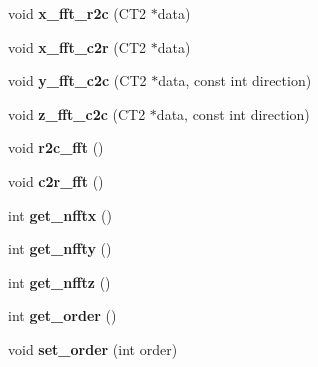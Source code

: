 \begin{DoxyCompactItemize}
\item 
\hypertarget{classCudaPMERecip_a7ec365cc8c4a9cb3cb5b58d575ebf40c}{}\label{classCudaPMERecip_a7ec365cc8c4a9cb3cb5b58d575ebf40c} 
void {\bfseries x\+\_\+fft\+\_\+r2c} (C\+T2 $\ast$data)
\item 
\hypertarget{classCudaPMERecip_af59edddef7fc70c6788594d7872b2001}{}\label{classCudaPMERecip_af59edddef7fc70c6788594d7872b2001} 
void {\bfseries x\+\_\+fft\+\_\+c2r} (C\+T2 $\ast$data)
\item 
\hypertarget{classCudaPMERecip_a3e83fe23990aa4501e64255473828ba5}{}\label{classCudaPMERecip_a3e83fe23990aa4501e64255473828ba5} 
void {\bfseries y\+\_\+fft\+\_\+c2c} (C\+T2 $\ast$data, const int direction)
\item 
\hypertarget{classCudaPMERecip_a86a345d67878a9f8d42bfc3c0eadbbd9}{}\label{classCudaPMERecip_a86a345d67878a9f8d42bfc3c0eadbbd9} 
void {\bfseries z\+\_\+fft\+\_\+c2c} (C\+T2 $\ast$data, const int direction)
\item 
\hypertarget{classCudaPMERecip_a7b6245521dd5912a5ec31c7c13f7433c}{}\label{classCudaPMERecip_a7b6245521dd5912a5ec31c7c13f7433c} 
void {\bfseries r2c\+\_\+fft} ()
\item 
\hypertarget{classCudaPMERecip_ae638f74b6074d4c50fdd41ff84a8bfdd}{}\label{classCudaPMERecip_ae638f74b6074d4c50fdd41ff84a8bfdd} 
void {\bfseries c2r\+\_\+fft} ()
\item 
\hypertarget{classCudaPMERecip_a6fdbe5f297b227e69d8cf7638012f296}{}\label{classCudaPMERecip_a6fdbe5f297b227e69d8cf7638012f296} 
int {\bfseries get\+\_\+nfftx} ()
\item 
\hypertarget{classCudaPMERecip_a16d048d9f9f23644a6021c45c685c0ef}{}\label{classCudaPMERecip_a16d048d9f9f23644a6021c45c685c0ef} 
int {\bfseries get\+\_\+nffty} ()
\item 
\hypertarget{classCudaPMERecip_a8380c164295fb5fe3f8c823b8c655b85}{}\label{classCudaPMERecip_a8380c164295fb5fe3f8c823b8c655b85} 
int {\bfseries get\+\_\+nfftz} ()
\item 
\hypertarget{classCudaPMERecip_a0bd7a8bb0e484230f3cb61b7d89f4104}{}\label{classCudaPMERecip_a0bd7a8bb0e484230f3cb61b7d89f4104} 
int {\bfseries get\+\_\+order} ()
\item 
\hypertarget{classCudaPMERecip_a5e1bca0437dbb6b876dcb8058dde326c}{}\label{classCudaPMERecip_a5e1bca0437dbb6b876dcb8058dde326c} 
void {\bfseries set\+\_\+order} (int order)
\end{DoxyCompactItemize}
